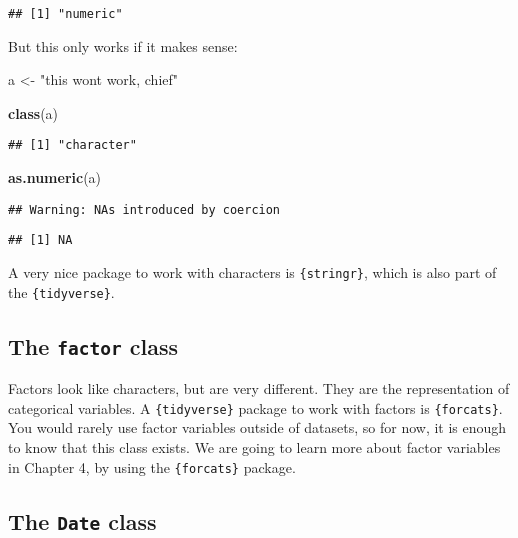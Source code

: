 \documentclass[
]{article}
\newenvironment{Shaded}{\begin{snugshade}}{\end{snugshade}}
\newcommand{\KeywordTok}[1]{\textcolor[rgb]{0.13,0.29,0.53}{\textbf{#1}}}
\newcommand{\NormalTok}[1]{#1}
\newcommand{\StringTok}[1]{\textcolor[rgb]{0.31,0.60,0.02}{#1}}
\begin{document}
\begin{verbatim}
## [1] "numeric"
\end{verbatim}

But this only works if it makes sense:

\begin{Shaded}
\begin{Highlighting}[]
\NormalTok{a \textless{}{-}}\StringTok{ "this won\textquotesingle{}t work, chief"}

\KeywordTok{class}\NormalTok{(a)}
\end{Highlighting}
\end{Shaded}

\begin{verbatim}
## [1] "character"
\end{verbatim}

\begin{Shaded}
\begin{Highlighting}[]
\KeywordTok{as.numeric}\NormalTok{(a)}
\end{Highlighting}
\end{Shaded}

\begin{verbatim}
## Warning: NAs introduced by coercion
\end{verbatim}

\begin{verbatim}
## [1] NA
\end{verbatim}

A very nice package to work with characters is \texttt{\{stringr\}}, which is also part of the \texttt{\{tidyverse\}}.

\hypertarget{the-factor-class}{%
\subsection{\texorpdfstring{The \texttt{factor} class}{The factor class}}\label{the-factor-class}}

Factors look like characters, but are very different. They are the representation of categorical
variables. A \texttt{\{tidyverse\}} package to work with factors is \texttt{\{forcats\}}. You would rarely use
factor variables outside of datasets, so for now, it is enough to know that this class exists.
We are going to learn more about factor variables in Chapter 4, by using the \texttt{\{forcats\}} package.

\hypertarget{the-date-class}{%
\subsection{\texorpdfstring{The \texttt{Date} class}{The Date class}}\label{the-date-class}}
\end{document}
